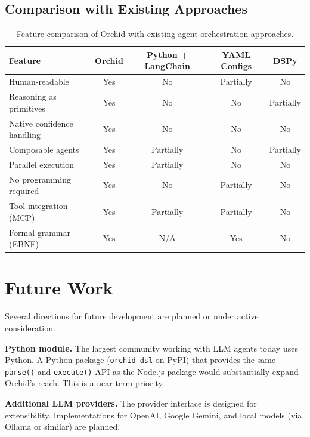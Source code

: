 \documentclass[11pt,a4paper]{article}
\begin{document}
\subsection{Comparison with Existing Approaches}

\begin{table}[h]
\centering
\small
\begin{tabular}{lcccc}
\toprule
\textbf{Feature} & \textbf{Orchid} & \textbf{Python + LangChain} & \textbf{YAML Configs} & \textbf{DSPy} \\
\midrule
Human-readable            & Yes & No        & Partially & No        \\
Reasoning as primitives   & Yes & No        & No        & Partially \\
Native confidence handling & Yes & No       & No        & No        \\
Composable agents         & Yes & Partially & No        & Partially \\
Parallel execution        & Yes & Partially & No        & No        \\
No programming required   & Yes & No        & Partially & No        \\
Tool integration (MCP)    & Yes & Partially & Partially & No        \\
Formal grammar (EBNF)     & Yes & N/A       & Yes       & No        \\
\bottomrule
\end{tabular}
\caption{Feature comparison of Orchid with existing agent orchestration approaches.}
\label{tab:comparison}
\end{table}

\section{Future Work}

Several directions for future development are planned or under active consideration.

\textbf{Python module.} The largest community working with LLM agents today uses Python. A Python package (\texttt{orchid-dsl} on PyPI) that provides the same \texttt{parse()} and \texttt{execute()} API as the Node.js package would substantially expand Orchid's reach. This is a near-term priority.

\textbf{Additional LLM providers.} The provider interface is designed for extensibility. Implementations for OpenAI, Google Gemini, and local models (via Ollama or similar) are planned.
\end{document}
